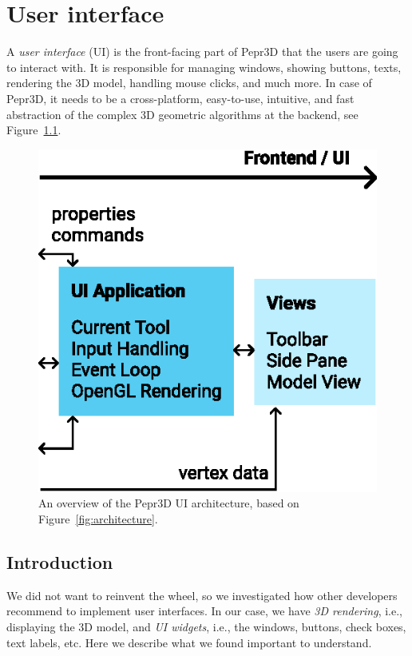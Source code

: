 \chapter{User interface}

A \emph{user interface} (UI) is the front-facing part of Pepr3D that the users are going to interact with.
It is responsible for managing windows, showing buttons, texts, rendering the 3D model, handling mouse clicks, and much more.
In case of Pepr3D, it needs to be a cross-platform, easy-to-use, intuitive, and fast abstraction of the complex 3D geometric algorithms at the backend, see Figure~\ref{fig:architecture_ui}.

\begin{figure}[h]
	\centering
	\centerline{\includegraphics[scale=0.9]{images/architecture_ui.eps}}
	\caption{An overview of the Pepr3D UI architecture, based on Figure~\ref{fig:architecture}.}
	\label{fig:architecture_ui}
\end{figure}
\vspace{-1.5em}
\section{Introduction}

We did not want to reinvent the wheel, so we investigated how other developers recommend to implement user interfaces.
In our case, we have \emph{3D rendering}, i.e., displaying the 3D model, and \emph{UI widgets}, i.e., the windows, buttons, check boxes, text labels, etc.
Here we describe what we found important to understand.

